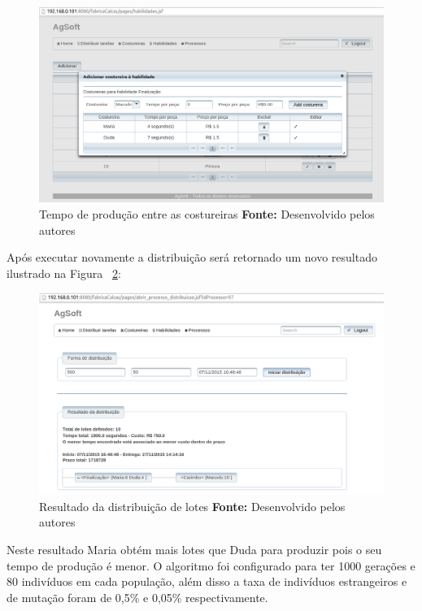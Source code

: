 \begin{figure}[h!]
	\centerline{\includegraphics[scale=0.4]{./imagens/alterando_tempo_costureira.png}}
	\caption[Tempo de produção entre as costureiras]
	{Tempo de produção entre as costureiras \textbf{Fonte:} Desenvolvido pelos autores}
	\label{fig:tempo_costureiras}
\end{figure}

\par Após executar novamente a distribuição será retornado um novo resultado
ilustrado na Figura ~\ref{fig:novo_resultado_distribuicao_teste1}:

\begin{figure}[h!]
	\centerline{\includegraphics[scale=0.4]{./imagens/novo_resultado_alterado_tempo_teste1.png}}
	\caption[Resultado da distribuição de lotes]
	{Resultado da distribuição de lotes \textbf{Fonte:} Desenvolvido pelos autores}
	\label{fig:novo_resultado_distribuicao_teste1}
\end{figure}

\par Neste resultado Maria obtém mais lotes que Duda para produzir pois o seu
tempo de produção é menor. O algoritmo foi configurado para ter 1000
gerações e 80 indivíduos em cada população, além disso a taxa de indivíduos estrangeiros e de mutação 
foram de 0,5\% e 0,05\% respectivamente.


